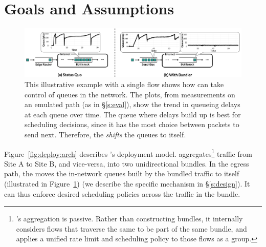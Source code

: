 \section{Goals and Assumptions}\label{s:deploy}
\begin{figure}[t]
    \centering
    \includegraphics[width=\textwidth]{img/shift-bottleneck-combined}
    \caption{This illustrative example with a single flow shows how \name can take control of queues in the network. The plots, from measurements on an emulated path (as in \S\ref{s:eval}), show the trend in queueing delays at each queue over time. The queue where delays build up is best for scheduling decisions, since it has the most choice between packets to send next. Therefore, the \inbox \emph{shifts} the queues to itself.}\label{fig:design:shift-bottleneck}
\end{figure}
%



Figure~\ref{fig:deploy:arch} describes \name's deployment model. 
\name aggregates\footnote{\name's aggregation is passive. Rather than constructing bundles, it internally considers flows that traverse the same \pair to be part of the same bundle, and applies a unified rate limit and scheduling policy to those flows as a group.} traffic from Site A to Site B, and vice-versa, into two unidirectional bundles. 
In the egress path, the \inbox moves the in-network queues built by the bundled traffic to itself (illustrated in Figure~\ref{fig:design:shift-bottleneck}) (we describe the specific mechanism in \S\ref{s:design}). 
It can thus enforce desired scheduling policies across the traffic in the bundle.

